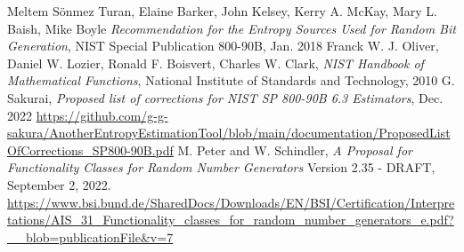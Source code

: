 ﻿\documentclass[a4paper,xelatex,english]{bxjsarticle}
\begin{document}
\setcounter{section}{2}
\begin{thebibliography}{99}
Meltem S\"{o}nmez Turan,
Elaine Barker,
John Kelsey,
Kerry A. McKay,
Mary L. Baish,
Mike Boyle
\textit{Recommendation for the Entropy Sources Used for Random Bit Generation},
NIST Special Publication 800-90B, Jan. 2018
Franck W. J. Oliver,
Daniel W. Lozier,
Ronald F. Boisvert,
Charles W. Clark,
\textit{NIST Handbook of Mathematical Functions},
National Institute of Standards and Technology, 2010
G. Sakurai, \textit{Proposed list of corrections for NIST SP 800-90B 6.3 Estimators}, Dec. 2022
\url{https://github.com/g-g-sakura/AnotherEntropyEstimationTool/blob/main/documentation/ProposedListOfCorrections_SP800-90B.pdf}
M. Peter and W. Schindler,
\textit{A Proposal for Functionality Classes for Random Number Generators}
Version 2.35 - DRAFT,
September 2, 2022.
\url{https://www.bsi.bund.de/SharedDocs/Downloads/EN/BSI/Certification/Interpretations/AIS_31_Functionality_classes_for_random_number_generators_e.pdf?__blob=publicationFile&v=7}
\end{thebibliography}
\end{document}
